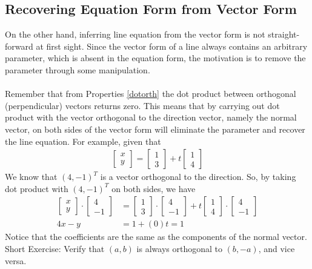 \subsection{Recovering Equation Form from Vector Form} On the other hand, inferring line equation from the vector form is not straight-forward at first sight. Since the vector form of a line always contains an arbitrary parameter, which is absent in the equation form, the motivation is to remove the parameter through some manipulation.\\
\\
Remember that from Properties \ref{dotorth} the dot product between orthogonal (perpendicular) vectors returns zero. This means that by carrying out dot product with the vector orthogonal to the direction vector, namely the normal vector, on both sides of the vector form will eliminate the parameter and recover the line equation. For example, given that
\begin{align*}
\begin{bmatrix}
x\\
y
\end{bmatrix}
=
\begin{bmatrix}
1\\
3
\end{bmatrix}
+ t
\begin{bmatrix}
1 \\
4
\end{bmatrix} 
\end{align*}
We know that $(4, -1)^T$ is a vector orthogonal to the direction. So, by taking dot product with $(4, -1)^T$ on both sides, we have
\begin{align*}
\begin{bmatrix}
x\\
y
\end{bmatrix}
\cdot
\begin{bmatrix}
4\\
-1
\end{bmatrix}
&=
\begin{bmatrix}
1\\
3
\end{bmatrix}
\cdot
\begin{bmatrix}
4\\
-1
\end{bmatrix}
+ t
\begin{bmatrix}
1 \\
4
\end{bmatrix} 
\cdot
\begin{bmatrix}
4\\
-1
\end{bmatrix}\\
4x - y &= 1 + (0)t = 1
\end{align*}
Notice that the coefficients are the same as the components of the normal vector.\\
Short Exercise: Verify that $(a, b)$ is always orthogonal to $(b, -a)$, and vice versa.

